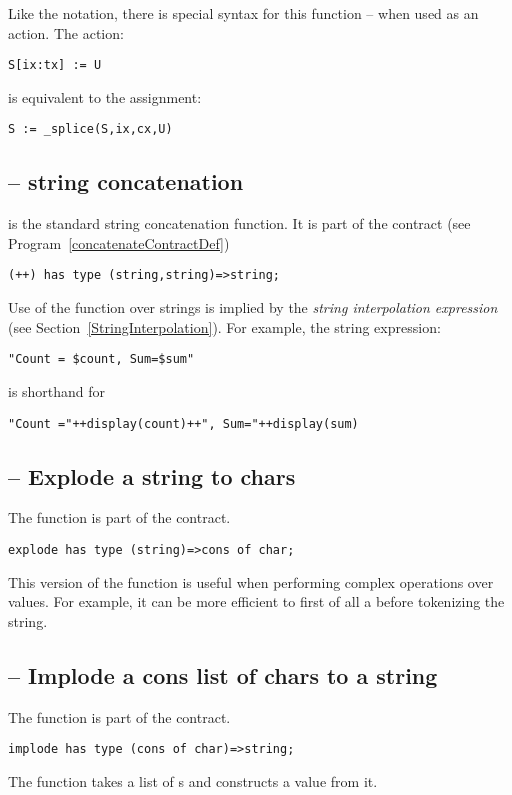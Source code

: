 Like the  notation, there is special syntax for this function -- when used as an action. The action:
\begin{lstlisting}
S[ix:tx] := U
\end{lstlisting}
is equivalent to the assignment:
\begin{lstlisting}
S := _splice(S,ix,cx,U)
\end{lstlisting}

\subsection{\q{++} -- string concatenation}
\label{stringConcatFunction}
\q{++} is the standard string concatenation function. It is part of the  contract (see Program~\vref{concatenateContractDef})
\begin{lstlisting}
(++) has type (string,string)=>string;
\end{lstlisting}

Use of the \q{++} function over strings is implied by the \emph{string interpolation expression} (see Section~\vref{StringInterpolation}). For example, the string expression:
\begin{lstlisting}
"Count = $count, Sum=$sum"
\end{lstlisting}
is shorthand for
\begin{lstlisting}
"Count ="++display(count)++", Sum="++display(sum)
\end{lstlisting}

\subsection{ -- Explode a string to chars}
\label{stringExplodeFunction}
The  function is part of the  contract.
\begin{lstlisting}
explode has type (string)=>cons of char;
\end{lstlisting}
\begin{aside}
This version of the  function is useful when performing complex operations over  values. For example, it can be more efficient to first of all  a  before tokenizing the string.
\end{aside}

\subsection{ -- Implode a cons list of chars to a string}
\label{stringImplodeFunction}
The  function is part of the  contract.
\begin{lstlisting}
implode has type (cons of char)=>string;
\end{lstlisting}
The  function takes a  list of s and constructs a  value from it.

